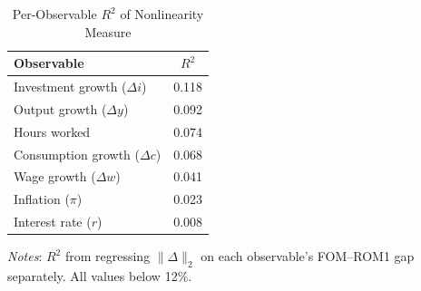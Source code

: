 \documentclass[12pt]{article}
\theoremstyle{plain}
\theoremstyle{definition}
\theoremstyle{remark}
\begin{document}
\begin{table}[htbp]
\centering
\caption{Per-Observable $R^2$ of Nonlinearity Measure}
\label{tab:per_obs_r2}
\begin{tabular}{lc}
\toprule
Observable & $R^2$ \\
\midrule
Investment growth ($\Delta i$) & 0.118 \\
Output growth ($\Delta y$) & 0.092 \\
Hours worked & 0.074 \\
Consumption growth ($\Delta c$) & 0.068 \\
Wage growth ($\Delta w$) & 0.041 \\
Inflation ($\pi$) & 0.023 \\
Interest rate ($r$) & 0.008 \\
\bottomrule
\end{tabular}
\smallskip
{\footnotesize \textit{Notes}: $R^2$ from regressing $\|\Delta\|_2$ on each observable's FOM--ROM1 gap separately. All values below 12\%.}
\end{table}
\end{document}
